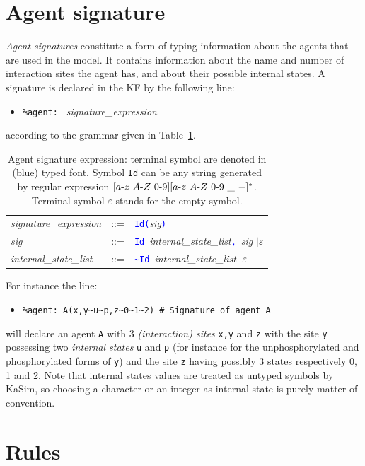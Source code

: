 \documentclass[11pt]{book}
\def\KaSim{\textsf{KaSim}}
\def\sep{\hbox{-}}
\def\int{\hbox{\texttt{\~}}}
\def\tcb#1{\textcolor{blue}{\ttt{#1}}}
\def\ttt#1{\texttt{#1}}
\def\ITE#1{\begin{itemize}#1\end{itemize}}
\begin{document}
\section{Agent signature}\label{sec:sig}
%
\emph{Agent signatures} constitute a form of typing information about the agents that are used in the model. It contains information about the name and number of interaction sites the agent has, and about their possible internal states. A signature is declared in the KF by the following line:
\ITE{
\item[] \ttt{\%agent: } \textit{signature\_expression}
}
according to the grammar given in Table~\ref{tab:sig}.
\begin{table}[htbp]
  \centering
  \begin{tabular}{@{} lcl @{}}
    \textit{signature\_expression} & ::= & \tcb{Id}\tcb{(}\textit{sig}\tcb{)} \\ 
    \textit{sig} & ::= & \tcb{Id}~\textit{internal\_state\_list}\tcb{,}\ \textit{sig} $\mid\varepsilon$ \\ 
    \textit{internal\_state\_list} & ::= & \tcb{\int Id}~\textit{internal\_state\_list} $\mid\varepsilon$
    \end{tabular}
  \caption{Agent signature expression: terminal symbol are denoted in (blue) typed font. Symbol \ttt{Id} can be any string generated by regular expression $[a\sep z\ A\sep Z\ 0\sep 9][a\sep z\ A \sep Z\ 0\sep 9\ \_ \ -]^*$. Terminal symbol $\varepsilon$ stands for the empty symbol.}
  \label{tab:sig}
\end{table}
For instance the line:
\ITE{
\item[] \ttt{\%agent: A(x,y\int u\int p,z\int 0\int 1\int 2) \# Signature of agent A} 
}
will declare an agent \ttt{A} with 3 \emph{(interaction) sites} \ttt{x,y} and \ttt{z} with the site \ttt{y} possessing two \emph{internal states} \ttt{u} and \ttt{p} (for instance for the unphosphorylated and phosphorylated forms of \ttt{y}) and the site \ttt{z} having possibly 3 states respectively 0, 1 and 2. Note that internal states values are treated as untyped symbols by \KaSim, so choosing a character or an integer as internal state is purely matter of convention. 

\section{Rules}\label{sec:rules}
\end{document}
